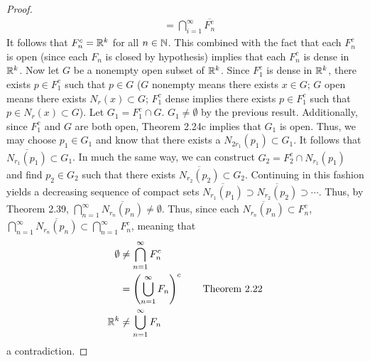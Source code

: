 \documentclass[../psets.tex]{subfiles}
\begin{document}
\begin{enumerate}[label={\textbf{\arabic*.}}]
\begin{proof}
\begin{align*}
            &= \bigcap_{i=1}^\infty\overline{F_n^c}\tag*{Exercise 2.9d}
        \end{align*}
        It follows that $F_n^c=\mathbb{R}^k$ for all $n\in\mathbb{N}$. This combined with the fact that each $F_n^c$ is open (since each $F_n$ is closed by hypothesis) implies that each $F_n^c$ is dense in $\mathbb{R}^k$. Now let $G$ be a nonempty open subset of $\mathbb{R}^k$. Since $F_1^c$ is dense in $\mathbb{R}^k$, there exists $p\in F_1^c$ such that $p\in G$ ($G$ nonempty means there exists $x\in G$; $G$ open means there exists $N_r(x)\subset G$; $F_1^c$ dense implies there exists $p\in F_1^c$ such that $p\in N_r(x)\subset G$). Let $G_1=F_1^c\cap G$. $G_1\neq\emptyset$ by the previous result. Additionally, since $F_1^c$ and $G$ are both open, Theorem 2.24c implies that $G_1$ is open. Thus, we may choose $p_1\in G_1$ and know that there exists a $N_{2r_1}(p_1)\subset G_1$. It follows that $\overline{N_{r_1}(p_1)}\subset G_1$. In much the same way, we can construct $G_2=F_2^c\cap N_{r_1}(p_1)$ and find $p_2\in G_2$ such that there exists $\overline{N_{r_2}(p_2)}\subset G_2$. Continuing in this fashion yields a decreasing sequence of compact sets $\overline{N_{r_1}(p_1)}\supset\overline{N_{r_2}(p_2)}\supset\cdots$. Thus, by Theorem 2.39, $\bigcap_{n=1}^\infty\overline{N_{r_n}(p_n)}\neq\emptyset$. Thus, since each $\overline{N_{r_n}(p_n)}\subset F_n^c$, $\bigcap_{n=1}^\infty\overline{N_{r_n}(p_n)}\subset\bigcap_{n=1}^\infty F_n^c$, meaning that
        \begin{align*}
            \emptyset &\neq \bigcap_{n=1}^\infty F_n^c\\
            &= \left( \bigcup_{n=1}^\infty F_n \right)^c\tag*{Theorem 2.22}\\
            \mathbb{R}^k &\neq \bigcup_{n=1}^\infty F_n
        \end{align*}
        a contradiction.
    \end{proof}
\end{enumerate}
\end{document}
